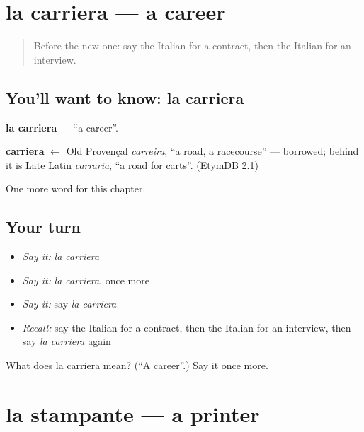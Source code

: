 \section[la carriera]{la carriera — a career}

\label{lesson:IT-C203-carriera}



\begin{quote}
Before the new one: say the Italian for a contract, then the Italian for an interview.
\end{quote}

\subsection*{You'll want to know: la carriera}
\textbf{la carriera} — \textquotedblleft{}a career\textquotedblright{}.

\begin{cousinweb}
\textbf{carriera} $\leftarrow$ Old Provençal \emph{carreira}, \textquotedblleft{}a road, a racecourse\textquotedblright{} — borrowed; behind it is Late Latin \emph{carraria}, \textquotedblleft{}a road for carts\textquotedblright{}. (EtymDB 2.1)
\end{cousinweb}

\begin{grammarlens}[title={What you've built}]
One more word for this chapter.
\end{grammarlens}

\subsection*{Your turn}
\begin{itemize}
\raggedright
  \item \emph{Say it:} \emph{la carriera}
  \item \emph{Say it:} \emph{la carriera}, once more
  \item \emph{Say it:} say \emph{la carriera}
  \item \emph{Recall:} say the Italian for a contract, then the Italian for an interview, then say \emph{la carriera} again
\end{itemize}

\begin{tcolorbox}[breakable,colback=teal!4,colframe=teal!35!black,title={Before you move on}]
What does la carriera mean? (\textquotedblleft{}A career\textquotedblright{}.) Say it once more.
\end{tcolorbox}
\section[la stampante]{la stampante — a printer}

